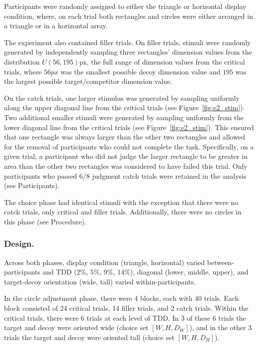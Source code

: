 Participants were randomly assigned to either the triangle or horizontal display condition, where, on each trial both rectangles and circles were either arranged in a triangle or in a horizontal array.

The experiment also contained filler trials. On filler trials, stimuli were randomly generated by independently sampling three rectangles' dimension values from the distribution $U(56,195)$px, the full range of dimension values from the critical trials, where $56px$ was the smallest possible decoy dimension value and $195$ was the largest possible target/competitor dimension value.

On the catch trials, one larger stimulus was generated by sampling uniformly along the upper diagonal line from the critical trials (see Figure~\ref{fig:e2_stim}). Two additional smaller stimuli were generated by sampling uniformly from the lower diagonal line from the critical trials (see Figure~\ref{fig:e2_stim}). This ensured that one rectangle was always larger than the other two rectangles and allowed for the removal of participants who could not complete the task. Specifically, on a given trial, a participant who did not judge the larger rectangle to be greater in area than the other two rectangles was considered to have failed this trial. Only participants who passed $6/8$ judgment catch trials were retained in the analysis (see Participants).

The choice phase had identical stimuli with the exception that there were no catch trials, only critical and filler trials. Additionally, there were no circles in this phase (see Procedure). 

\subsubsection{Design.}
Across both phases, display condition (triangle, horizontal) varied between-participants and TDD ($2\%$, $5\%$, $9\%$, $14\%$), diagonal (lower, middle, upper), and target-decoy orientation (wide, tall) varied within-participants. 

In the circle adjustment phase, there were 4 blocks, each with 40 trials. Each block consisted of 24 critical trials, 14 filler trials, and 2 catch trials. Within the critical trials, there were 6 trials at each level of TDD. In 3 of these 6 trials the target and decoy were oriented wide (choice set $[W,H,D_{W}]$), and in the other 3 trials the target and decoy were oriented tall (choice set $[W,H,D_{H}]$). 

